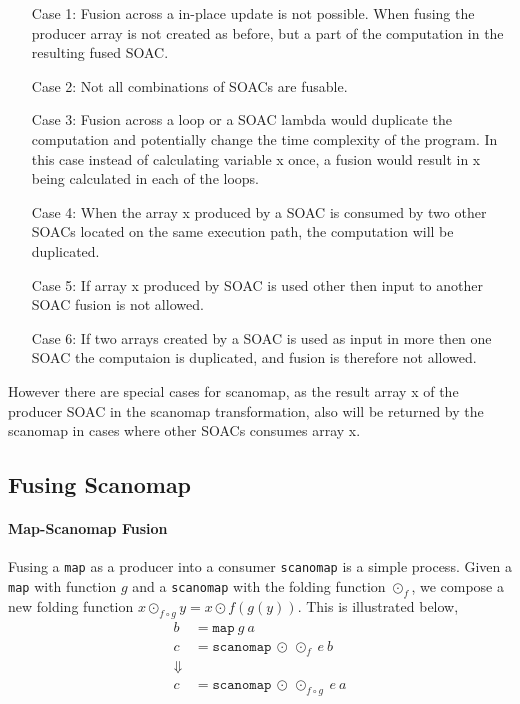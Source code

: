 \documentclass[11pt]{article}
\begin{document}
\begin{itemize}
\item[Case 1:] Fusion across a in-place update is not possible. When fusing the producer array is not created as before, but a part of the computation in the resulting fused SOAC.
\item[Case 2:] Not all combinations of SOACs are fusable.
\item[Case 3:] Fusion across a loop or a SOAC lambda would duplicate the computation and potentially change the time complexity of the program. In this case instead of calculating variable x once, a fusion would result in x being calculated in each of the loops. 
\item[Case 4:] When the array x produced by a SOAC is consumed by two other SOACs located on the same execution path, the computation will be duplicated.
\item[Case 5:] If array x produced by SOAC is used other then input to another SOAC fusion is not allowed.
\item[Case 6:] If two arrays created by a SOAC is used as input in more then one SOAC the computaion is duplicated, and fusion is therefore not allowed.
\end{itemize}

However there are special cases for scanomap, as the result array x of the producer SOAC in the scanomap transformation, also will be returned by the scanomap in cases where other SOACs consumes array x.


\subsection{Fusing Scanomap}

\paragraph{Map-Scanomap Fusion}
Fusing a \texttt{map} as a producer into a consumer \texttt{scanomap} is a simple process. Given a \texttt{map} with function $g$ and a 
 \texttt{scanomap} with the folding function $\odot_f$, we compose a new folding function $x \odot_{f \circ g} y = x \odot f (g (y))$. This is illustrated below,
\begin{align*}
  b &= \mathtt{map} \: g \: a \\
  c &= \mathtt{scanomap} \: \odot \: \odot_f \: e \: b \\
\Downarrow \\
  c &= \mathtt{scanomap} \: \odot \: \odot_{f\circ g} \: e \: a
\end{align*}
\end{document}
